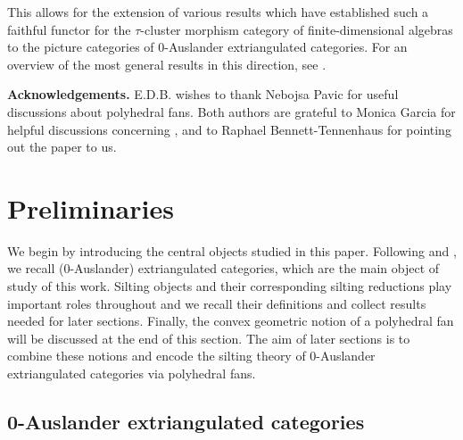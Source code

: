 \documentclass[10pt,twoside, a4paper,reqno]{amsart}
\theoremstyle{definition}
\begin{document}
This allows for the extension of various results which have established such a faithful functor for the $\tau$-cluster morphism category of finite-dimensional algebras to the picture categories of 0-Auslander extriangulated categories. For an overview of the most general results in this direction, see \cite{BorveKaipeltautilt,Kai23,Treffinger26}.

\textbf{Acknowledgements.} 
E.D.B. wishes to thank Nebojsa Pavic for useful discussions about polyhedral fans.
Both authors are grateful to Monica Garcia for helpful discussions concerning , and to Raphael Bennett-Tennenhaus for pointing out the paper \cite{ZLZ2026} to us. 

\section{Preliminaries}

We begin by introducing the central objects studied in this paper. Following \cite{NP19} and \cite{GNP23}, we recall (0-Auslander) extriangulated categories, which are the main object of study of this work. Silting objects and their corresponding silting reductions play important roles throughout and we recall their definitions and collect results needed for later sections. Finally, the convex geometric notion of a polyhedral fan will be discussed at the end of this section. The aim of later sections is to combine these notions and encode the silting theory of 0-Auslander extriangulated categories via polyhedral fans.

\subsection{0-Auslander extriangulated categories}
\end{document}

